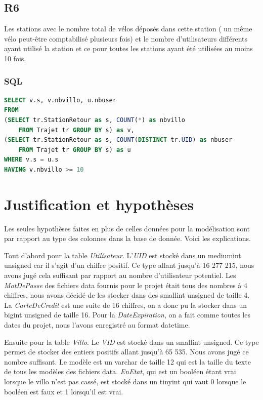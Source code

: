 \documentclass[a4paper, 12pt]{report}
\begin{document}
\subsection*{R6}

Les stations avec le nombre total de vélos déposés dans cette station ( un même vélo peut-être comptabilisé plusieurs fois) et le nombre d'utilisateurs différents ayant utilisé la station et ce pour toutes les stations ayant été utilisées au moins 10 fois.

\subsubsection*{SQL}
\begin{lstlisting}[language=sql]
SELECT v.s, v.nbvillo, u.nbuser
FROM
(SELECT tr.StationRetour as s, COUNT(*) as nbvillo 
	FROM Trajet tr GROUP BY s) as v,
(SELECT tr.StationRetour as s, COUNT(DISTINCT tr.UID) as nbuser 
	FROM Trajet tr GROUP BY s) as u
WHERE v.s = u.s
HAVING v.nbvillo >= 10
\end{lstlisting}

\section*{Justification et hypothèses}
Les seules hypothèses faites en plus de celles données pour la modélisation sont par rapport au type des colonnes dans la base de donnée. Voici les explications.

Tout d'abord pour la table \textit{Utilisateur}. L'\textit{UID} est stocké dans un mediumint unsigned car il s'agit d'un chiffre positif. Ce type allant jusqu'à 16 277 215, nous avons jugé cela suffisant par rapport au nombre d'utilisateur potentiel. Les \textit{MotDePasse} des fichiers data fournis pour le projet était tous des nombres à 4 chiffres, nous avons décidé de les stocker dans des smallint unsigned de taille 4. La \textit{CarteDeCredit} est une suite de 16 chiffres, on a donc pu la stocker dans un bigint unsigned de taille 16. Pour la \textit{DateExpiration}, on a fait comme toutes les dates du projet, nous l'avons enregistré au format datetime.

Ensuite pour la table \textit{Villo}. Le \textit{VID} est stocké dans un smallint unsigned. Ce type permet de stocker des entiers positifs allant jusqu'à 65 535. Nous avons jugé ce nombre suffisant. Le modèle est un varchar de taille 12 qui est la taille du texte de tous les modèles des fichiers data. \textit{EnEtat}, qui est un booléen étant vrai lorsque le villo n'est pas cassé, est stocké dans un tinyint qui vaut 0 lorsque le booléen est faux et 1 lorsqu'il est vrai.
\end{document}
